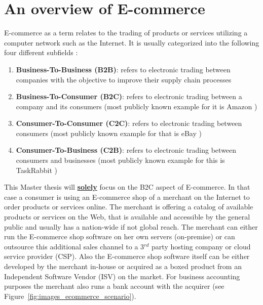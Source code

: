 
\section{An overview of E-commerce}
\label{sec:e_commerce_scenario}

E-commerce as a term relates to the trading of products or services utilizing a computer network such as the Internet. It is usually categorized into the following four different subfields \citep{sen2015study}:\@

\begin{enumerate}
  \item \textbf{Business-To-Business (\gls{B2B})}: refers to electronic trading between companies with the objective to improve their supply chain processes
  \item \textbf{Business-To-Consumer (\gls{B2C})}: refers to electronic trading between a company and its consumers (most publicly known example for it is Amazon \citep{Amazon.com})
  \item \textbf{Consumer-To-Consumer (\gls{C2C})}: refers to electronic trading between consumers (most publicly known example for that is eBay \citep{eBayInc})
  \item \textbf{Consumer-To-Business (\gls{C2B})}: refers to electronic trading between consumers and businesses (most publicly known example for this is TaskRabbit \citep{TaskRabbit})
\end{enumerate}

This Master thesis will \textbf{\underline{solely}} focus on the \gls{B2C} aspect of E-commerce. In that case a consumer is using an E-commerce shop of a merchant on the Internet to order products or services online. The merchant is offering a catalog of available products or services on the Web, that is available and accessible by the general public and usually has a nation-wide if not global reach. The merchant can either run the E-commerce shop software on her own servers (on-premise) or can outsource this additional sales channel to a 3$^{rd}$ party hosting company or cloud service provider (\gls{CSP}). Also the E-commerce shop software itself can be either developed by the merchant in-house or acquired as a boxed product from an Independent Software Vendor (\gls{ISV}) on the market. For business accounting purposes the merchant also runs a bank account with the acquirer (see Figure~\ref{fig:images_ecommerce_scenario}). \\

